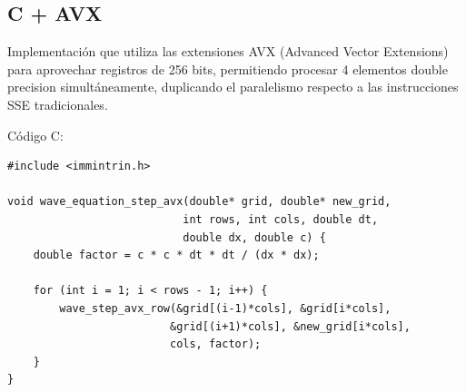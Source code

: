 \documentclass[a4paper]{article}
\begin{document}
\subsection{C + AVX}

Implementación que utiliza las extensiones AVX (Advanced Vector Extensions) para aprovechar registros de 256 bits, permitiendo procesar 4 elementos double precision simultáneamente, duplicando el paralelismo respecto a las instrucciones SSE tradicionales.

Código C:
\begin{verbatim}
#include <immintrin.h>

void wave_equation_step_avx(double* grid, double* new_grid,
                           int rows, int cols, double dt,
                           double dx, double c) {
    double factor = c * c * dt * dt / (dx * dx);
    
    for (int i = 1; i < rows - 1; i++) {
        wave_step_avx_row(&grid[(i-1)*cols], &grid[i*cols], 
                         &grid[(i+1)*cols], &new_grid[i*cols], 
                         cols, factor);
    }
}
\end{verbatim}
\end{document}
